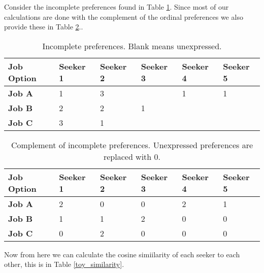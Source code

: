 Consider the incomplete preferences found in Table \ref{toy_incomplete}. Since most of our calculations are done with the complement of the ordinal preferences we also provide these in Table \ref{toy_complement}..

\begin{table}[h!]
\begin{center}
\caption{Incomplete preferences. Blank means unexpressed.}
\label{toy_incomplete}
\begin{tabular}{l|l|l|l|l|l}
\hline 
\textbf{Job Option} & \textbf{Seeker 1} &  \textbf{Seeker 2} & \textbf{Seeker 3} &\textbf{Seeker 4} &\textbf{Seeker 5} \\
\hline
\textbf{Job A} & 1 & 3 &  & 1 & 1\\
\textbf{Job B} & 2 & 2 & 1 & &\\
\textbf{Job C} & 3 & 1 &  & &\\
\hline 
\end{tabular}
\end{center}
\end{table}

\begin{table}[h!]
\begin{center}
\caption{Complement of incomplete preferences. Unexpressed preferences are replaced with 0.}
\label{toy_complement}
\begin{tabular}{l|l|l|l|l|l}
\hline 
\textbf{Job Option} & \textbf{Seeker 1} &  \textbf{Seeker 2} & \textbf{Seeker 3} &\textbf{Seeker 4} &\textbf{Seeker 5} \\
\hline
\textbf{Job A} & 2 & 0 & 0 & 2 & 1\\
\textbf{Job B} & 1 & 1 & 2 & 0 & 0\\
\textbf{Job C} & 0 & 2 & 0 & 0 & 0\\
\hline 
\end{tabular}
\end{center}
\end{table}

Now from here we can calculate the cosine simiilarity of each seeker to each other, this is in Table \ref{toy_similarity}.

